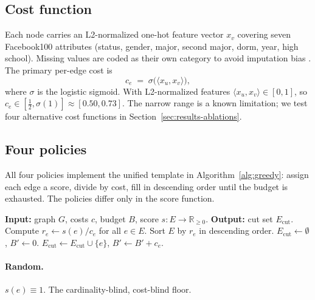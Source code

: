 \documentclass{article}
\begin{document}
\subsection{Cost function}

Each node carries an L2-normalized one-hot feature vector $x_v$
covering seven Facebook100 attributes (status, gender, major, second
major, dorm, year, high school). Missing values are coded as their
own category to avoid imputation bias \citep{traud2012facebook100}.
The primary per-edge cost is
\begin{equation}
\label{eq:cost}
    c_e \;=\; \sigma\!\bigl(\langle x_u, x_v \rangle\bigr),
\end{equation}
where $\sigma$ is the logistic sigmoid. With L2-normalized features
$\langle x_u, x_v \rangle \in [0, 1]$, so
$c_e \in [\tfrac{1}{2}, \sigma(1)] \approx [0.50, 0.73]$. The
narrow range is a known limitation; we test four alternative cost
functions in Section~\ref{sec:results-ablations}.

\subsection{Four policies}

All four policies implement the unified template in
Algorithm~\ref{alg:greedy}: assign each edge a score, divide by cost,
fill in descending order until the budget is exhausted. The policies
differ only in the score function.

\begin{algorithm}[t]
\caption{Cost-aware greedy edge removal}
\label{alg:greedy}
\begin{algorithmic}
    \STATE \textbf{Input:} graph $G$, costs $c$, budget $B$, score $s : E \to \mathbb{R}_{\geq 0}$.
    \STATE \textbf{Output:} cut set $E_{\mathrm{cut}}$.
    \STATE Compute $r_e \leftarrow s(e) / c_e$ for all $e \in E$.
    \STATE Sort $E$ by $r_e$ in descending order.
    \STATE $E_{\mathrm{cut}} \leftarrow \emptyset$, $B' \leftarrow 0$.
            \STATE $E_{\mathrm{cut}} \leftarrow E_{\mathrm{cut}} \cup \{e\}$, $B' \leftarrow B' + c_e$.
        \ENDIF
    \ENDFOR
\end{algorithmic}
\end{algorithm}

\paragraph{Random.} $s(e) \equiv 1$. The cardinality-blind, cost-blind
floor.
\end{document}
